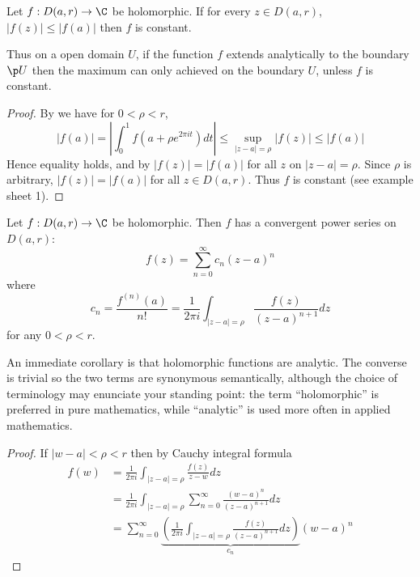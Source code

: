 \documentclass[a4paper]{article}
\begin{document}
\begin{theorem}
  Let \(f: D(a, r) \to \C\) be holomorphic. If for every \(z \in D(a, r)\), \(|f(z)| \leq |f(a)|\) then \(f\) is constant.
\end{theorem}

Thus on a open domain \(U\), if the function \(f\) extends analytically to the boundary \(\p U\) then the maximum can only achieved on the boundary \(U\), unless \(f\) is constant.

\begin{proof}
  By  we have for \(0 < \rho < r\),
  \[
    |f(a)|
    = \left| \int_0^1 f(a + \rho e^{2\pi it}) dt \right|
    \leq \sup_{|z - a| = \rho} |f(z)|
    \leq |f(a)|
  \]
  Hence equality holds, and by  \(|f(z)| = |f(a)|\) for all \(z\) on \(|z - a| = \rho\). Since \(\rho\) is arbitrary, \(|f(z)| = |f(a)|\) for all \(z \in D(a, r)\). Thus \(f\) is constant (see example sheet 1).
\end{proof}

\begin{theorem}
  \label{thm:Taylor}
  Let \(f: D(a, r) \to \C\) be holomorphic. Then \(f\) has a convergent power series on \(D(a, r)\):
  \[
    f(z) = \sum_{n = 0}^\infty c_n (z - a)^n
  \]
  where
  \[
    c_n = \frac{f^{(n)}(a)}{n!} = \frac{1}{2\pi i} \int_{|z - a| = \rho} \frac{f(z)}{(z - a)^{n + 1}} dz
  \]
  for any \(0 < \rho < r\).
\end{theorem}

An immediate corollary is that holomorphic functions are analytic. The converse is trivial so the two terms are synonymous semantically, although the choice of terminology may enunciate your standing point: the term ``holomorphic'' is preferred in pure mathematics, while ``analytic'' is used more often in applied mathematics.

\begin{proof}
  If \(|w - a| < \rho < r\) then by Cauchy integral formula
  \begin{align*}
    f(w) &= \frac{1}{2\pi i} \int_{|z - a| = \rho} \frac{f(z)}{z - w} dz \\
         &= \frac{1}{2\pi i} \int_{|z - a| = \rho} \sum_{n = 0}^\infty \frac{(w - a)^n}{(z - a)^{n + 1}} dz \\
         &= \sum_{n = 0}^\infty \underbrace{\left( \frac{1}{2\pi i} \int_{|z - a| = \rho} \frac{f(z)}{(z - a)^{n + 1}} dz \right)}_{c_n} (w - a)^n
  \end{align*}
\end{proof}
\end{document}
